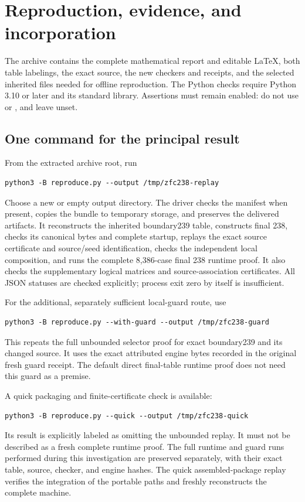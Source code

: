 \section{Reproduction, evidence, and incorporation}
\label{sec:reproduction}

The archive contains the complete mathematical report and editable
LaTeX, both table labelings, the exact source, the new checkers and
receipts, and the selected inherited files needed for offline
reproduction. The Python checks require Python 3.10 or later and its
standard library. Assertions must remain enabled: do not use
 or , and leave  unset.

\subsection{One command for the principal result}

From the extracted archive root, run
\begin{verbatim}
python3 -B reproduce.py --output /tmp/zfc238-replay
\end{verbatim}
Choose a new or empty output directory. The driver checks the manifest
when present, copies the bundle to temporary storage, and preserves the
delivered artifacts. It reconstructs the inherited boundary239 table,
constructs final 238, checks its canonical bytes and complete startup,
replays the exact source certificate and source/seed identification,
checks the independent local composition, and runs the complete
8,386-case final 238 runtime proof. It also checks the supplementary
logical matrices and source-association certificates. All JSON statuses
are checked explicitly; process exit zero by itself is insufficient.

For the additional, separately sufficient local-guard route, use
\begin{verbatim}
python3 -B reproduce.py --with-guard --output /tmp/zfc238-guard
\end{verbatim}
This repeats the full unbounded selector proof for exact boundary239
and its changed source. It uses the exact attributed engine bytes
recorded in the original fresh guard receipt. The default direct
final-table runtime proof does not need this guard as a premise.

A quick packaging and finite-certificate check is available:
\begin{verbatim}
python3 -B reproduce.py --quick --output /tmp/zfc238-quick
\end{verbatim}
Its result is explicitly labeled as omitting the unbounded replay.
It must not be described as a fresh complete runtime proof. The full
runtime and guard runs performed during this investigation are preserved
separately, with their exact table, source, checker, and engine hashes.
The quick assembled-package replay verifies the integration of the
portable paths and freshly reconstructs the complete machine.

